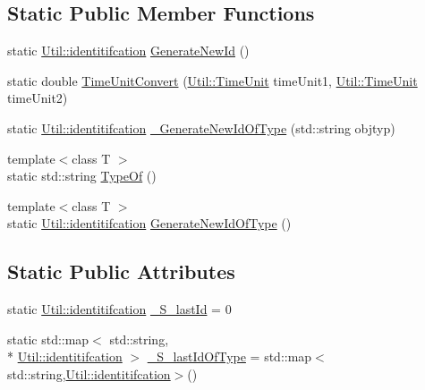 \subsection*{Static Public Member Functions}
\begin{DoxyCompactItemize}
\item 
static \hyperlink{class_util_ad17d458d9344b10bba64347e514d6d71}{Util\-::identitifcation} \hyperlink{class_util_a59ecba8027c38a9d0a3a0e9e9dc94ad7}{Generate\-New\-Id} ()
\item 
static double \hyperlink{class_util_a5f537febaa83db4721745a4730657bab}{Time\-Unit\-Convert} (\hyperlink{class_util_aadbd82055afeaa7d4fb4da513de628ff}{Util\-::\-Time\-Unit} time\-Unit1, \hyperlink{class_util_aadbd82055afeaa7d4fb4da513de628ff}{Util\-::\-Time\-Unit} time\-Unit2)
\item 
static \hyperlink{class_util_ad17d458d9344b10bba64347e514d6d71}{Util\-::identitifcation} \hyperlink{class_util_ab92bcba2a33782b6228d575da4aae0ad}{\-\_\-\-Generate\-New\-Id\-Of\-Type} (std\-::string objtyp)
\item 
{\footnotesize template$<$class T $>$ }\\static std\-::string \hyperlink{class_util_a1010d1207367e48e1d417381f32abf1f}{Type\-Of} ()
\item 
{\footnotesize template$<$class T $>$ }\\static \hyperlink{class_util_ad17d458d9344b10bba64347e514d6d71}{Util\-::identitifcation} \hyperlink{class_util_aec5f31f4f467113c25a6aef7bb5f4a40}{Generate\-New\-Id\-Of\-Type} ()
\end{DoxyCompactItemize}
\subsection*{Static Public Attributes}
\begin{DoxyCompactItemize}
\item 
static \hyperlink{class_util_ad17d458d9344b10bba64347e514d6d71}{Util\-::identitifcation} \hyperlink{class_util_afe2f6d8c09ef1108299a4dc8ec59b133}{\-\_\-\-S\-\_\-last\-Id} = 0
\item 
static std\-::map$<$ std\-::string, \\*
\hyperlink{class_util_ad17d458d9344b10bba64347e514d6d71}{Util\-::identitifcation} $>$ \hyperlink{class_util_a06a8897362f4bd17c68d59557083fc56}{\-\_\-\-S\-\_\-last\-Id\-Of\-Type} = std\-::map$<$std\-::string,\hyperlink{class_util_ad17d458d9344b10bba64347e514d6d71}{Util\-::identitifcation}$>$()
\end{DoxyCompactItemize}


